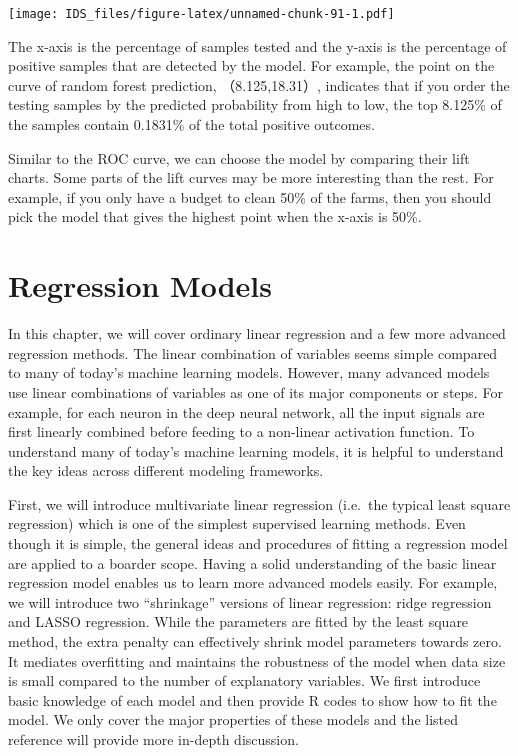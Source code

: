 \documentclass[12pt,]{krantz}
\begin{document}
\texttt{[image: IDS\_files/figure-latex/unnamed-chunk-91-1.pdf]}

The x-axis is the percentage of samples tested and the y-axis is the percentage of positive samples that are detected by the model. For example, the point on the curve of random forest prediction, （8.125,18.31）, indicates that if you order the testing samples by the predicted probability from high to low, the top 8.125\% of the samples contain 0.1831\% of the total positive outcomes.

Similar to the ROC curve, we can choose the model by comparing their lift charts. Some parts of the lift curves may be more interesting than the rest. For example, if you only have a budget to clean 50\% of the farms, then you should pick the model that gives the highest point when the x-axis is 50\%.

\hypertarget{regression-models}{%
\chapter{Regression Models}\label{regression-models}}

In this chapter, we will cover ordinary linear regression and a few more advanced regression methods. The linear combination of variables seems simple compared to many of today's machine learning models. However, many advanced models use linear combinations of variables as one of its major components or steps. For example, for each neuron in the deep neural network, all the input signals are first linearly combined before feeding to a non-linear activation function. To understand many of today's machine learning models, it is helpful to understand the key ideas across different modeling frameworks.

First, we will introduce multivariate linear regression (i.e.~the typical least square regression) which is one of the simplest supervised learning methods. Even though it is simple, the general ideas and procedures of fitting a regression model are applied to a boarder scope. Having a solid understanding of the basic linear regression model enables us to learn more advanced models easily. For example, we will introduce two ``shrinkage'' versions of linear regression: ridge regression and LASSO regression. While the parameters are fitted by the least square method, the extra penalty can effectively shrink model parameters towards zero. It mediates overfitting and maintains the robustness of the model when data size is small compared to the number of explanatory variables. We first introduce basic knowledge of each model and then provide R codes to show how to fit the model. We only cover the major properties of these models and the listed reference will provide more in-depth discussion.
\end{document}

